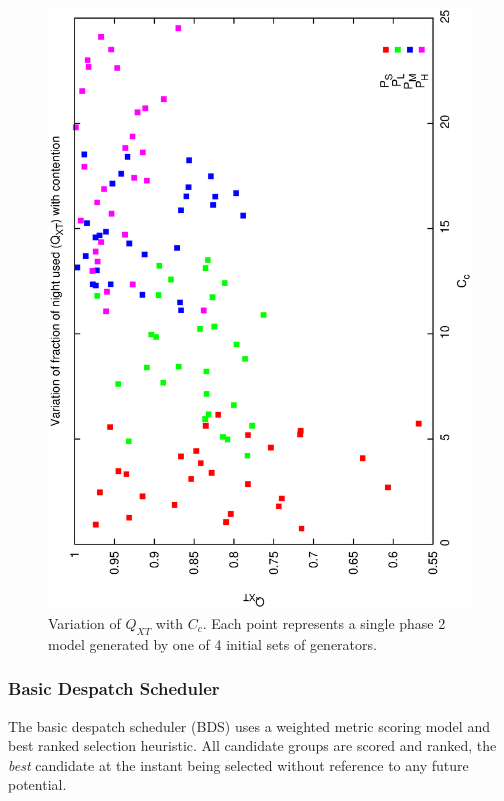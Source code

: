 \documentclass[12pt,a4paper]{article}
\begin{document}
{\begin{figure}[h]
\begin{center}
 \includegraphics[scale=0.5, angle=-90]{figures/p2_gen_qxt.eps}
 \caption[Variation of $Q_{XT}$ with $C_C$ for variable phase2 generator models.] 
   {Variation of $Q_{XT}$ with $C_c$. Each point represents a single phase 2 model generated by one of 4 initial sets of generators.}
\label{fig:p2_gen_xt}
\end{center} 
\end{figure}

\subsubsection{Basic Despatch Scheduler}
The basic despatch scheduler (BDS) uses a weighted metric scoring model and best ranked selection heuristic. All candidate groups are scored and ranked, the \emph{best} candidate at the instant being selected without reference to any future potential. 


}
\end{document}

